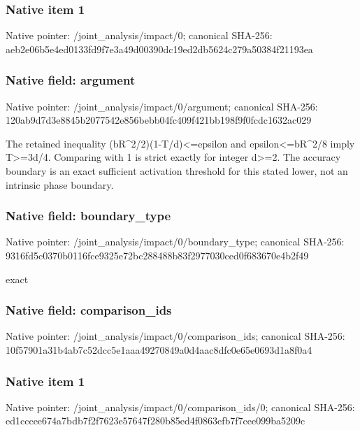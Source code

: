 \documentclass[10pt,a4paper]{article}
\begin{document}
\subsubsection{Native item 1}
Native pointer: /joint\_\allowbreak{}analysis/impact/0; canonical SHA-256: aeb2e06b5e4ed0133fd9f7e3a49d00390dc19ed2db5624c279a50384f21193ea

\subsubsection{Native field: argument}
Native pointer: /joint\_\allowbreak{}analysis/impact/0/argument; canonical SHA-256: 120ab9d7d3e8845b2077542e856bebb04fc409f421bb198f9f0fcdc1632ac029

\begingroup\raggedright\sloppy The retained inequality (bR\textasciicircum{}2/\allowbreak{}2)(1-T/\allowbreak{}d)<=\allowbreak{}epsilon and epsilon<=\allowbreak{}bR\textasciicircum{}2/\allowbreak{}8 imply T>=\allowbreak{}3d/\allowbreak{}4. Comparing with 1 is strict exactly for integer d>=\allowbreak{}2. The accuracy boundary is an exact sufficient activation threshold for this stated lower,\allowbreak{} not an intrinsic phase boundary.\par\endgroup

\subsubsection{Native field: boundary\_\allowbreak{}type}
Native pointer: /joint\_\allowbreak{}analysis/impact/0/boundary\_\allowbreak{}type; canonical SHA-256: 9316fd5c0370b0116fce9325e72bc288488b83f2977030ced0f683670e4b2f49

\begingroup\raggedright\sloppy exact\par\endgroup

\subsubsection{Native field: comparison\_\allowbreak{}ids}
Native pointer: /joint\_\allowbreak{}analysis/impact/0/comparison\_\allowbreak{}ids; canonical SHA-256: 10f57901a31b4ab7c52dcc5e1aaa49270849a0d4aac8dfc0e65e0693d1a8f0a4

\subsubsection{Native item 1}
Native pointer: /joint\_\allowbreak{}analysis/impact/0/comparison\_\allowbreak{}ids/0; canonical SHA-256: ed1cccee674a7bdb7f2f7623e57647f280b85ed4f0863efb7f7cee099ba5209c
\end{document}
